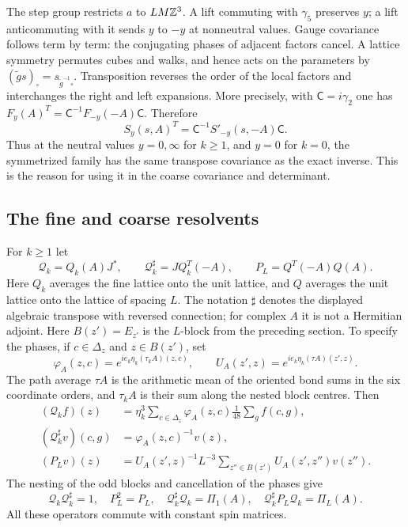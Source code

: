 The step group restricts $a$ to
$LM\mathbb Z^3$. A lift commuting with $\gamma_5$ preserves $y$; a lift
anticommuting with it sends $y$ to $-y$ at nonneutral values.
Gauge covariance follows term by term: the conjugating phases of
adjacent factors cancel. A lattice symmetry permutes cubes and walks,
and hence acts on the parameters by
$(\widetilde g s)_\square=s_{\widetilde g^{-1}\square}$.
Transposition reverses the order of
the local factors and interchanges the right and left expansions.
More precisely, with $\mathsf C=i\gamma_2$ one has
$F_y(A)^T=\mathsf C^{-1}F_{-y}(-A)\mathsf C$. Therefore
\begin{equation}\label{eq:weakened-transpose}
 S_y(s,A)^T=\mathsf C^{-1}S'_{-y}(s,-A)\mathsf C.
\end{equation}
Thus at the neutral values $y=0,\infty$ for $k\ge1$, and $y=0$
for $k=0$, the symmetrized family has the same transpose covariance as
the exact inverse. This is the reason for using it in the coarse
covariance and determinant.

\subsection{The fine and coarse resolvents}\label{subsec:fine-coarse-resolvent}

For $k\ge1$ let
\[
 \mathcal Q_k=Q_k(A)J^*,\qquad
 \mathcal Q_k^\sharp=JQ_k^T(-A),\qquad
 P_L=Q^T(-A)Q(A).
\]
Here $Q_k$ averages the fine lattice onto the unit lattice, and $Q$
averages the unit lattice onto the lattice of spacing $L$.
The notation $\sharp$ denotes the displayed algebraic transpose with
reversed connection; for complex $A$ it is not a Hermitian adjoint.
Here $B(z')=E_{z'}$ is the $L$-block from the preceding section.
To specify the phases, if $c\in\Delta_z$ and $z\in B(z')$, set
\[
 \varphi_A(z,c)=e^{ie_k\eta_k(\tau_kA)(z,c)},\qquad
 U_A(z',z)=e^{ie_k\eta_k(\tau A)(z',z)}.
\]
The path average $\tau A$ is the arithmetic mean of the oriented bond
sums in the six coordinate orders, and $\tau_kA$ is their sum along
the nested block centres. Then
\begin{align*}
 (\mathcal Q_kf)(z)&=\eta_k^3\sum_{c\in\Delta_z}
                \varphi_A(z,c)\frac1{48}\sum_gf(c,g),\\
 (\mathcal Q_k^\sharp v)(c,g)&=\varphi_A(z,c)^{-1}v(z),\\
 (P_Lv)(z)&=U_A(z',z)^{-1}L^{-3}
                    \sum_{z''\in B(z')}U_A(z',z'')v(z'').
\end{align*}
The nesting of the odd blocks and cancellation of the phases give
\begin{equation}\label{eq:block-algebra}
 \mathcal Q_k\mathcal Q_k^\sharp=1,\quad P_L^2=P_L,\quad
 \mathcal Q_k^\sharp\mathcal Q_k=\Pi_1(A),\quad
 \mathcal Q_k^\sharp P_L\mathcal Q_k=\Pi_L(A).
\end{equation}
All these operators commute with constant spin matrices.

